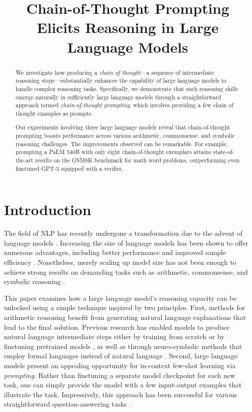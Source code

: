 \title{Chain-of-Thought Prompting Elicits Reasoning in Large Language Models}

\begin{abstract}
We investigate how producing a \textit{chain of thought}—a sequence of intermediate reasoning steps—substantially enhances the capability of large language models to handle complex reasoning tasks. Specifically, we demonstrate that such reasoning skills emerge naturally in sufficiently large language models through a straightforward approach termed \textit{chain-of-thought prompting}, which involves providing a few chain of thought examples as prompts.

Our experiments involving three large language models reveal that chain-of-thought prompting boosts performance across various arithmetic, commonsense, and symbolic reasoning challenges. The improvements observed can be remarkable. For example, prompting a PaLM 540B with only eight chain-of-thought exemplars attains state-of-the-art results on the GSM8K benchmark for math word problems, outperforming even finetuned GPT-3 equipped with a verifier.
\end{abstract}

\section{Introduction}
The field of NLP has recently undergone a transformation due to the advent of language models \citep[][\textit{inter alia}]{peters-etal-2018-deep,devlin-etal-2019-bert,brown2020language}. Increasing the size of language models has been shown to offer numerous advantages, including better performance and improved sample efficiency \citep[\textit{inter alia}]{kaplan2020scaling,brown2020language}. Nonetheless, merely scaling up model size has not been enough to achieve strong results on demanding tasks such as arithmetic, commonsense, and symbolic reasoning \citep{rae2021scaling}.

This paper examines how a large language model’s reasoning capacity can be unlocked using a simple technique inspired by two principles. First, methods for arithmetic reasoning benefit from generating natural language explanations that lead to the final solution. Previous research has enabled models to produce natural language intermediate steps either by training from scratch \citep{ling-etal-2017-program} or by finetuning pretrained models \citep{cobbe2021training}, as well as through neuro-symbolic methods that employ formal languages instead of natural language \citep{roy-roth-2015-solving, chiang-chen-2019-semantically,amini-etal-2019-mathqa, chen2019neural}. Second, large language models present an appealing opportunity for in-context few-shot learning via \emph{prompting}. Rather than finetuning a separate model checkpoint for each new task, one can simply provide the model with a few input-output examples that illustrate the task. Impressively, this approach has been successful for various straightforward question-answering tasks \citep{brown2020language}.

